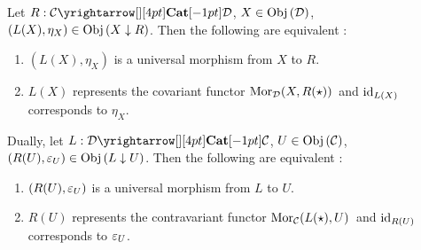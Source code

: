 \begin{prop}
  \hypertarget{uni_iff_rep}{}
  
  Let $R : \map{\CC}{\DD}{\CAT}{}$, $X \in \mathrm{Obj}\left(\mathcal{D}\right)$,
  $(L(X),\eta_X) \in \mathrm{Obj}\left(X\downarrow R\right)$. 
  Then the following are equivalent : 
  \begin{enumerate}
    \item $(L(X),\eta_X)$ is a universal morphism from $X$ to $R$.
    \item $L(X)$ represents the covariant functor $\mathrm{Mor}_{\mathcal{D}}(X, R(\star))\,$
    and $\mathrm{id}_{L(X)}$ corresponds to $\eta_X$. 
  \end{enumerate}

  Dually, let $L : \map{\DD}{\CC}{\CAT}{}$, $U \in \mathrm{Obj}\left(\mathcal{C}\right)$,
  $(R(U),\varepsilon_U) \in \mathrm{Obj}\left(L\downarrow U\right)$. 
  Then the following are equivalent : 
  \begin{enumerate}
    \item $(R(U),\varepsilon_U)$ is a universal morphism from $L$ to $U$.
    \item $R(U)$ represents the contravariant functor $\mathrm{Mor}_{\mathcal{C}}(L(\star), U)\,$
    and $\mathrm{id}_{R(U)}$ corresponds to $\varepsilon_U$.
  \end{enumerate}
\end{prop}
